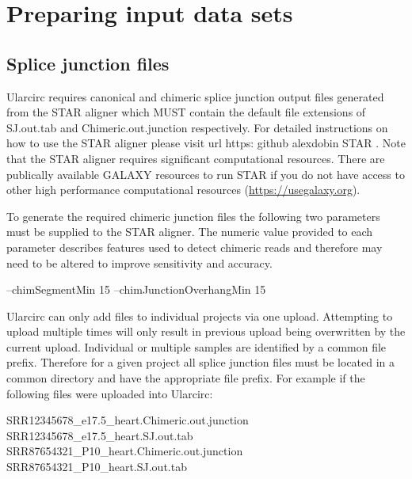 \documentclass[12pt]{article}\usepackage[]{graphicx}\usepackage[]{color}
\begin{document}
\section{Preparing input data sets} \label{sec:prepare}

\subsection{Splice junction files} \label{sec:FSJfiles}
\indent Ularcirc requires canonical and chimeric splice junction output files generated from the STAR aligner which  MUST contain the default file extensions of SJ.out.tab and Chimeric.out.junction respectively. For detailed instructions on how to use the STAR aligner please visit url https: github alexdobin STAR . Note that the STAR aligner requires significant computational resources. There are publically available GALAXY resources to run STAR if you do not have access to other high performance computational resources (\url {https://usegalaxy.org}). \par
To generate the required chimeric junction files the following two parameters must be supplied to the STAR aligner. The numeric value provided to each parameter describes features used to detect chimeric reads and therefore may need to be altered to improve sensitivity and accuracy.

\begin{mdframed}--chimSegmentMin 15  --chimJunctionOverhangMin 15 \end{mdframed}

Ularcirc can only add files to individual projects via one upload. Attempting to upload multiple times will only result in previous upload being overwritten by the current upload. Individual or multiple samples are identified by a common file prefix. Therefore for a given project all splice junction files must be located in a common directory and have the appropriate file prefix. For example if the following files were uploaded into Ularcirc:

\begin{mdframed}
SRR12345678\_e17.5\_heart.Chimeric.out.junction \\
SRR12345678\_e17.5\_heart.SJ.out.tab \\
SRR87654321\_P10\_heart.Chimeric.out.junction \\
SRR87654321\_P10\_heart.SJ.out.tab
\end{mdframed}
\end{document}
